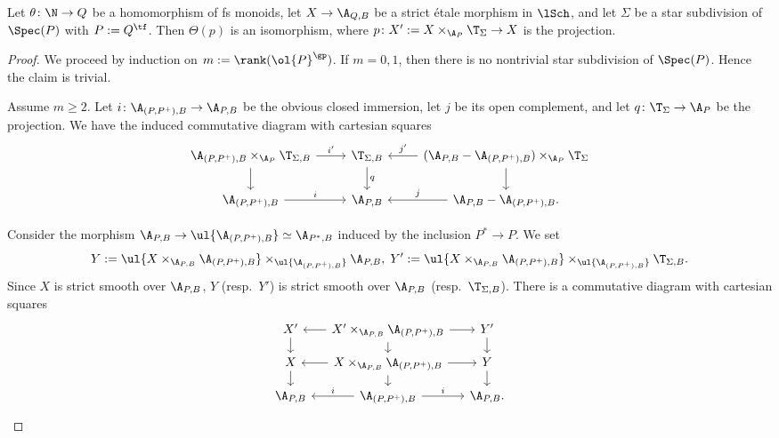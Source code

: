 \documentclass[10pt]{amsart}
\begin{document}
\begin{lem}
\label{lemma.8}
Let $\theta\colon \N\to Q$ be a homomorphism of fs monoids, let $X\to \A_{Q,B}$ be a strict \'etale morphism in $\lSch$, and let $\Sigma$ be a star subdivision of $\Spec(P)$ with $P:=Q^\tf$.
Then $\Theta(p)$ is an isomorphism, where $p\colon X':=X\times_{\A_P}\T_{\Sigma}\to X$ is the projection.
\end{lem}
\begin{proof}
We proceed by induction on $m:=\rank(\ol{P}^\gp)$.
If $m=0,1$, then there is no nontrivial star subdivision of $\Spec(P)$.
Hence the claim is trivial.

Assume $m\geq 2$.
Let $i\colon \A_{(P,P^+),B}\to \A_{P,B}$ be the obvious closed immersion, let $j$ be its open complement, and let $q\colon \T_\Sigma\to \A_P$ be the projection.
We have the induced commutative diagram with cartesian squares
\begin{equation}
\label{lemma.8.1}
\begin{tikzcd}
\A_{(P,P^+),B}\times_{\A_P}\T_{\Sigma,B}\ar[d]\ar[r,"i'"]&
\T_{\Sigma,B}\ar[d,"q"]\ar[r,leftarrow,"j'"]&
(\A_{P,B}-\A_{(P,P^+),B})\times_{\A_P}\T_\Sigma\ar[d]
\\
\A_{(P,P^+),B}\ar[r,"i"]&
\A_{P,B}\ar[r,leftarrow,"j"]&
\A_{P,B}-\A_{(P,P^+),B}.
\end{tikzcd}
\end{equation}

Consider the morphism $\A_{P,B}\to \ul{ \A_{(P,P^+),B}}\simeq \A_{P^*,B}$ induced by the inclusion $P^*\to P$.
We set
\[
Y:=\ul{X\times_{\A_{P,B}} \A_{(P,P^+),B}}\times_{\ul{\A_{(P,P^+),B}}}\A_{P,B},
\;
Y':=\ul{X\times_{\A_{P,B}} \A_{(P,P^+),B}}\times_{\ul{\A_{(P,P^+),B}}}\T_{\Sigma,B}.
\]
Since $X$ is strict smooth over $\A_{P,B}$, $Y$ (resp.\ $Y'$) is strict smooth over $\A_{P,B}$ (resp.\ $\T_{\Sigma,B}$).
There is a commutative diagram with cartesian squares
\begin{equation}
\label{lemma.8.2}
\begin{tikzcd}[column sep=small, row sep=small]
X'\ar[r,leftarrow]\ar[d]&
X'\times_{\A_{P,B}}\A_{(P,P^+),B}\ar[r]\ar[d]&
Y'\ar[d]
\\
X\ar[r,leftarrow]\ar[d]&
X\times_{\A_{P,B}}\A_{(P,P^+),B}\ar[d]\ar[r]&
Y\ar[d]
\\
\A_{P,B}\ar[r,leftarrow,"i"]&
\A_{(P,P^+),B}\ar[r,"i"]&
\A_{P,B}.
\end{tikzcd}
\end{equation}



\end{proof}
\end{document}
